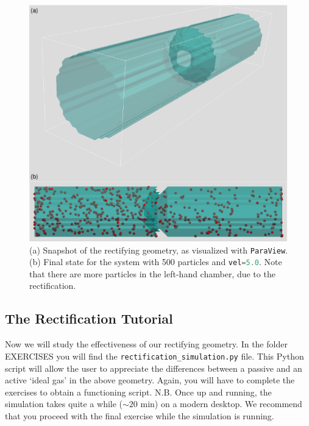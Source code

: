 \documentclass[aip,jcp,reprint,a4paper,onecolumn,amsmath]{revtex4-1}
\newcommand\code{\lstinline}
\newcommand\codees{\lstinline[language=python]}
\begin{document}
\begin{figure}[!htb]
\begin{center}
\includegraphics[scale=0.75]{FIGURES/rectify}
\end{center}
\caption{\label{fig:rectify}(a) Snapshot of the rectifying geometry, as visualized with \code{ParaView}. (b) Final state for the system with 500 particles and \codees{vel=5.0}. Note that there are more particles in the left-hand chamber, due to the rectification.}
\end{figure}

\subsection{\label{sub:rstut}The Rectification Tutorial}

Now we will study the effectiveness of our rectifying geometry. In the folder EXERCISES you will find the \code{rectification_simulation.py} file. This Python script will allow the user to appreciate the differences between a passive and an active `ideal gas' in the above geometry. Again, you will have to complete the exercises to obtain a functioning script. N.B. Once up and running, the simulation takes quite a while ($\sim20$ min) on a modern desktop. We recommend that you proceed with the final exercise while the simulation is running.
\end{document}
